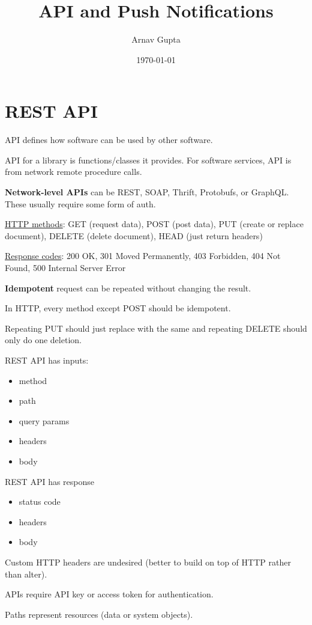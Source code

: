 \documentclass[11pt]{article}
\author{Arnav Gupta}
\date{\today}
\title{API and Push Notifications}
\begin{document}
\maketitle
\tableofcontents

\section{REST API}
\label{sec:org8a2af3a}
API defines how software can be used by other software.

API for a library is functions/classes it provides.
For software services, API is from network remote procedure calls.

\textbf{Network-level APIs} can be REST, SOAP, Thrift, Protobufs, or GraphQL.
These usually require some form of auth.

\uline{HTTP methods}: GET (request data), POST (post data), PUT (create or replace document), DELETE (delete
document), HEAD (just return headers)

\uline{Response codes}: 200 OK, 301 Moved Permanently, 403 Forbidden, 404 Not Found, 500 Internal Server Error

\textbf{Idempotent} request can be repeated without changing the result.

In HTTP, every method except POST should be idempotent.

Repeating PUT should just replace with the same and repeating DELETE should only do one deletion.

REST API has inputs:
\begin{itemize}
\item method
\item path
\item query params
\item headers
\item body
\end{itemize}

REST API has response
\begin{itemize}
\item status code
\item headers
\item body
\end{itemize}

Custom HTTP headers are undesired (better to build on top of HTTP rather than alter).

APIs require API key or access token for authentication.

Paths represent resources (data or system objects).
\end{document}
